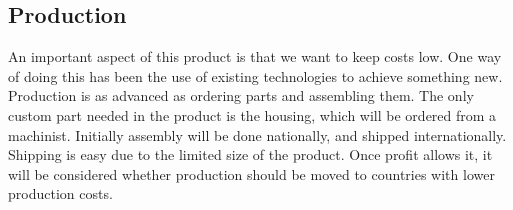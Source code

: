 \subsection{Production}
An important aspect of this product is that we want to keep costs low. One way of doing this has been the use of existing technologies to achieve something new. Production is as advanced as ordering parts and assembling them. The only custom part needed in the product is the housing, which will be ordered from a machinist. Initially assembly will be done nationally, and shipped internationally. Shipping is easy due to the limited size of the product. Once profit allows it, it will be considered whether production should be moved to countries with lower production costs.
